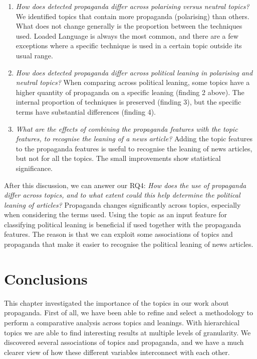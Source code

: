 \begin{enumerate}[label={\textbf{RQ4.\arabic*:}},leftmargin=2cm]
    \item \emph{How does detected propaganda differ across polarising versus neutral topics?} We identified topics that contain more propaganda (polarising) than others. What does not change generally is the proportion between the techniques used. Loaded Language is always the most common, and there are a few exceptions where a specific technique is used in a certain topic outside its usual range.
    \item \emph{How does detected propaganda differ across political leaning in polarising and neutral topics?} When comparing across political leaning, some topics have a higher quantity of propaganda on a specific leaning (finding 2 above). The internal proportion of techniques is preserved (finding 3), but the specific terms have substantial differences (finding 4).
    \item \textit{What are the effects of combining the propaganda features with the topic features, to recognise the leaning of a news article?} Adding the topic features to the propaganda features is useful to recognise the leaning of news articles, but not for all the topics. The small improvements show statistical significance.
\end{enumerate}

After this discussion, we can answer our RQ4: \emph{How does the use of propaganda differ across topics, and to what extent could this help determine the political leaning of articles?}
Propaganda changes significantly across topics, especially when considering the terms used. Using the topic as an input feature for classifying political leaning is beneficial if used together with the propaganda features. The reason is that we can exploit some associations of topics and propaganda that make it easier to recognise the political leaning of news articles.


\section{Conclusions}
\label{sec:topic_conclusion}

This chapter investigated the importance of the topics in our work about propaganda.
First of all, we have been able to refine and select a methodology to perform a comparative analysis across topics and leanings. With hierarchical topics we are able to find interesting results at multiple levels of granularity.
We discovered several associations of topics and propaganda, and we have a much clearer view of how these different variables interconnect with each other.

